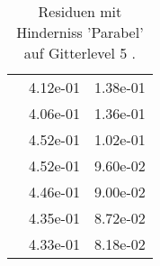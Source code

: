 \begin{table}
\begin{tabular}{c|cc|}
\multicolumn{1}{|c|}{} & \multicolumn{1}{|c|}{  4.12e-01} & \multicolumn{1}{|c|}{  1.38e-01} \\ 
\multicolumn{1}{|c|}{} & \multicolumn{1}{|c|}{  4.06e-01} & \multicolumn{1}{|c|}{  1.36e-01} \\ 
\multicolumn{1}{|c|}{} & \multicolumn{1}{|c|}{  4.52e-01} & \multicolumn{1}{|c|}{  1.02e-01} \\ 
\multicolumn{1}{|c|}{} & \multicolumn{1}{|c|}{  4.52e-01} & \multicolumn{1}{|c|}{  9.60e-02} \\ 
\multicolumn{1}{|c|}{} & \multicolumn{1}{|c|}{  4.46e-01} & \multicolumn{1}{|c|}{  9.00e-02} \\ 
\multicolumn{1}{|c|}{} & \multicolumn{1}{|c|}{  4.35e-01} & \multicolumn{1}{|c|}{  8.72e-02} \\ 
\multicolumn{1}{|c|}{} & \multicolumn{1}{|c|}{  4.33e-01} & \multicolumn{1}{|c|}{  8.18e-02} \\ 
\hline 
\end{tabular}\caption{Residuen mit Hinderniss 'Parabel' auf Gitterlevel 5 .}\label{tab:Residuum_Parabel_level5}
\end{table} 
